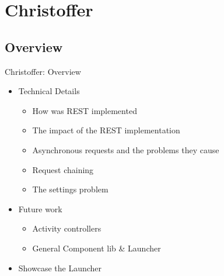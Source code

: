 \section{Christoffer}
\subsection{Overview}


\begin{frame}{Christoffer: Overview}
\begin{itemize}
  \item Technical Details
  		\begin{itemize}
  			\item How was REST implemented
  			\item The impact of the REST implementation
  			\item Asynchronous requests and the problems they cause
  			\item Request chaining
  			\item The settings problem	  
		\end{itemize}
  \item Future work
  		\begin{itemize}
  			\item Activity controllers
  			\item General Component lib \& Launcher 
		\end{itemize}
  \item Showcase the Launcher
\end{itemize}
\end{frame}

